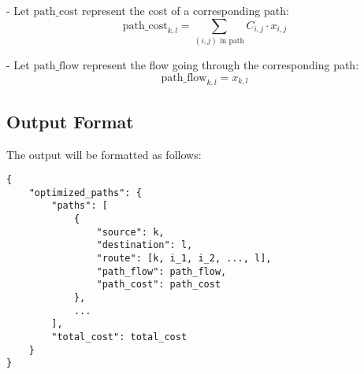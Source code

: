 \documentclass{article}
\begin{document}
- Let \( \text{path\_cost} \) represent the cost of a corresponding path:
\[
\text{path\_cost}_{k,l} = \sum_{(i,j) \text{ in path}} C_{i,j} \cdot x_{i,j}
\]

- Let \( \text{path\_flow} \) represent the flow going through the corresponding path:
\[
\text{path\_flow}_{k,l} = x_{k,l}
\]

\subsection*{Output Format}
The output will be formatted as follows:
\begin{verbatim}
{
    "optimized_paths": {
        "paths": [
            {
                "source": k,
                "destination": l,
                "route": [k, i_1, i_2, ..., l],
                "path_flow": path_flow,
                "path_cost": path_cost
            },
            ...
        ],
        "total_cost": total_cost
    }
}
\end{verbatim}
\end{document}
